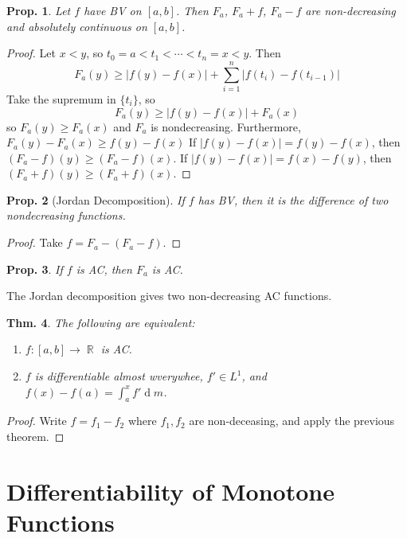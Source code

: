 \documentclass[12pt, a4paper]{book}
\DeclareMathOperator{\R}{\mathbb{R}}
\renewcommand{\d}[1]{\ensuremath{\operatorname{d}\!{#1}}} %
\newtheorem{theorem}{Thm.}[section]
\newtheorem{proposition}[theorem]{Prop.}
\theoremstyle{nonumberplain}
\newtheorem{proof}{Proof}
\begin{document}
\begin{proposition}
    Let $f$ have BV on $[a,b]$.
    Then $F_a$, $F_a+f$, $F_a-f$ are non-decreasing and absolutely continuous on $[a,b]$.
\end{proposition}
\begin{proof}
    Let $x<y$, so $t_0=a<t_1<\cdots<t_n=x<y$.
    Then
    \[F_a(y)\geq|f(y)-f(x)|+\sum\limits_{i=1}^n |f(t_i)-f(t_{i-1})|\]
    Take the supremum in $\{t_i\}$, so
    \[F_a(y)\geq|f(y)-f(x)|+F_a(x)\]
    so $F_a(y)\geq F_a(x)$ and $F_a$ is nondecreasing.
    Furthermore, $F_a(y)-F_a(x)\geq f(y)-f(x)$
    If $|f(y)-f(x)|=f(y)-f(x)$, then $(F_a-f)(y)\geq(F_a-f)(x)$.
    If $|f(y)-f(x)|=f(x)-f(y)$, then $(F_a+f)(y)\geq(F_a+f)(x)$.
\end{proof}
\begin{proposition}[Jordan Decomposition]
    If $f$ has BV, then it is the difference of two nondecreasing functions.
\end{proposition}
\begin{proof}
    Take $f=F_a-(F_a-f)$.
\end{proof}
\begin{proposition}
    If $f$ is AC, then $F_a$ is AC.
\end{proposition}
The Jordan decomposition gives two non-decreasing AC functions.
\begin{theorem}
    The following are equivalent:
    \begin{enumerate}[nolistsep]
        \item $f:[a,b]\to\R$ is AC.
        \item $f$ is differentiable almost wverywhee, $f'\in L^1$, and $f(x)-f(a)=\int_a^x f'\d{m}$.
    \end{enumerate}
\end{theorem}
\begin{proof}
    Write $f=f_1-f_2$ where $f_1,f_2$ are non-deceasing, and apply the previous theorem.
\end{proof}
\section{Differentiability of Monotone Functions}
\end{document}
